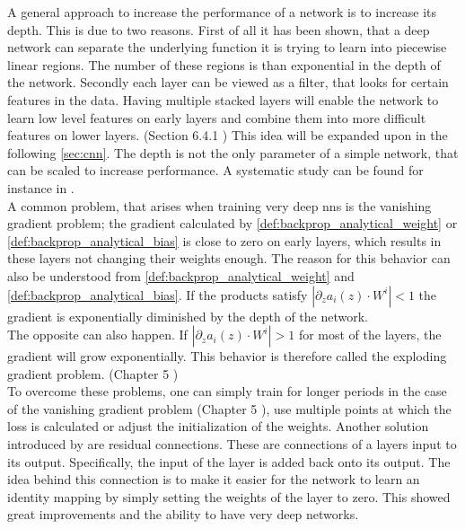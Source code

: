 A general approach to increase the performance of a network is to increase its depth. This is due to two reasons. First of all it has been shown, that a deep network can separate the underlying function it is trying to learn into piecewise linear regions. The number of these regions is than exponential in the depth of the network. Secondly each layer can be viewed as a filter, that looks for certain features in the data. Having multiple stacked layers will enable the network to learn low level features on early layers and combine them into more difficult features on lower layers. (Section 6.4.1 \cite{deep_learning_book}) This idea will be expanded upon in the following \autoref{sec:cnn}. The depth is not the only parameter of a simple network, that can be scaled to increase performance. A systematic study can be found for instance in \cite{efficient_net}.\\
A common problem, that arises when training very deep \gls{nns} is the vanishing gradient problem; the gradient calculated by \eqref{def:backprop_analytical_weight} or \eqref{def:backprop_analytical_bias} is close to zero on early layers, which results in these layers not changing their weights enough. The reason for this behavior can also be understood from \eqref{def:backprop_analytical_weight} and \eqref{def:backprop_analytical_bias}. If the products satisfy $\left|\partial_z a_i(z)\cdot W^i\right|<1$ the gradient is exponentially diminished by the depth of the network.\\
The opposite can also happen. If $\left|\partial_z a_i(z)\cdot W^i\right|>1$ for most of the layers, the gradient will grow exponentially. This behavior is therefore called the exploding gradient problem. (Chapter 5 \cite{deep_learning_beginning})\\
To overcome these problems, one can simply train for longer periods in the case of the vanishing gradient problem (Chapter 5 \cite{deep_learning_beginning}), use multiple points at which the loss is calculated \cite{inception_module} or adjust the initialization of the weights. Another solution introduced by \cite{residual_connections_invention} are residual connections. These are connections of a layers input to its output. Specifically, the input of the layer is added back onto its output. The idea behind this connection is to make it easier for the network to learn an identity mapping by simply setting the weights of the layer to zero. This showed great improvements and the ability to have very deep networks\cite{residual_connections_invention}.
